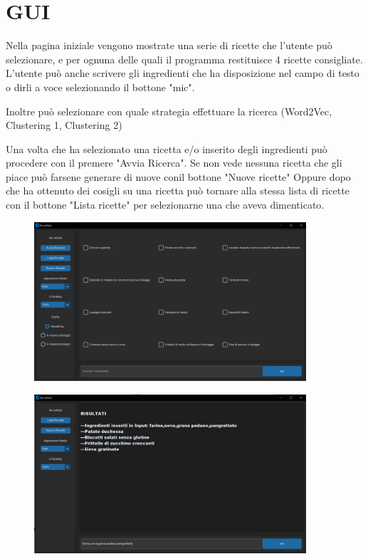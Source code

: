 \documentclass[12pt]{report}
\begin{document}
\section{GUI}
 Nella pagina iniziale vengono mostrate una serie di ricette che l'utente può selezionare, e per ognuna    delle quali il programma restituisce 4 ricette consigliate.
 L'utente può anche scrivere gli ingredienti che ha disposizione nel campo di testo o dirli a voce  selezionando il bottone "mic".

Inoltre può selezionare con quale strategia effettuare la ricerca (Word2Vec, Clustering 1, Clustering 2)
 
 Una volta che ha selezionato una ricetta e/o inserito degli ingredienti può procedere con il premere "Avvia Ricerca".
 Se non vede nessuna ricetta che gli piace può farsene generare di nuove conil bottone "Nuove ricette" Oppure dopo che ha ottenuto dei cosigli su una ricetta può tornare alla stessa lista di ricette con il bottone "Lista ricette" per selezionarne una che aveva dimenticato.
 

\begin{figure}[H]
        \centering
        {\includegraphics[width=0.9\textwidth]{img/img32.jpg}}
\end{figure}

\begin{figure}[H]
        \centering
        {\includegraphics[width=0.9\textwidth]{img/img31.jpg}}
\end{figure}
\end{document}
